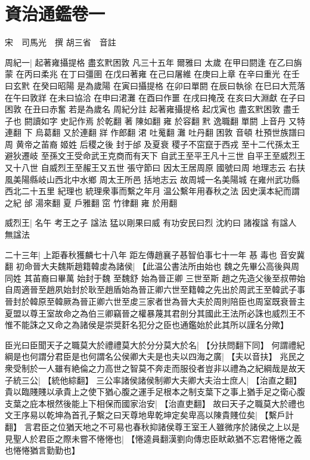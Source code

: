 \chapter{資治通鑑卷一}


宋　司馬光　撰\newline
胡三省　音註

周紀一|{
	起著雍攝提格 盡玄黓困敦 凡三十五年
	爾雅曰
	太歲
	在甲曰閼逢
	在乙曰旃蒙
	在丙曰柔兆
	在丁曰彊圉
	在戊曰著雍
	在己曰屠維
	在庚曰上章
	在辛曰重光
	在壬曰玄黓
	在癸曰昭陽
	是為歲陽
	在寅曰攝提格
	在卯曰單閼
	在辰曰執徐
	在巳曰大荒落
	在午曰敦牂
	在未曰協洽
	在申曰涒灘
	在酉曰作噩
	在戌曰掩茂
	在亥曰大淵獻
	在子曰困敦
	在丑曰赤奮
	若是為歲名
	周紀分註 起著雍攝提格 起戊寅也
	盡玄黓困敦 盡壬子也
	閼讀如字 史記作焉 於乾翻
	著 陳如翻
	雍 於容翻
	黓 逸職翻
	單閼 上音丹 又特連翻
	下 烏葛翻 又於連翻
	牂 作郎翻
	涒 吐䰟翻
	灘 吐丹翻
	困敦 音頓
	杜預世族譜曰 周 黄帝之苖裔 姬姓
	后稷之後 封于邰 及夏衰 稷子不窋竄于西戎
	至十二代孫太王 避狄遷岐
	至孫文王受命武王克商而有天下
	自武王至平王凡十三世
	自平王至威烈王又十八世
	自威烈王至赧王又五世
	張守節曰 因太王居周原 國號曰周
	地理志云 右扶風美陽縣岐山西北中水鄉 周太王所邑
	括地志云 故周城一名美陽城 在雍州武功縣西北二十五里 紀理也 統理衆事而繫之年月
	温公繫年用春秋之法 因史漢本紀而謂之紀
	邰 湯來翻
	夏 戶雅翻
	窋 竹律翻
	雍 於用翻}
\par
威烈王|{
	名午 考王之子
	諡法 猛以剛果曰威 有功安民曰烈
	沈約曰 諸複諡 有諡人 無諡法}
\par
二十三年|{
	上距春秋獲麟七十八年 距左傳趙襄子惎智伯事七十一年
	惎 毒也 音安冀翻}
初命晉大夫魏斯趙籍韓䖍為諸侯|{
	【此温公書法所由始也
	魏之先畢公高後與周同姓 其苖裔曰畢萬 始封于魏
	至魏舒 始為晉正卿 三世至斯
	趙之先造父後至叔帶始自周適晉至趙夙始封於耿至趙盾始為晉正卿六世至籍韓之先出於周武王至韓武子事晉封於韓原至韓厥為晉正卿六世至䖍三家者世為晉大夫於周則陪臣也周室既衰晉主夏盟以尊王室故命之為伯三卿竊晉之權暴蔑其君剖分其國此王法所必誅也威烈王不惟不能誅之又命之為諸侯是崇奨姧名犯分之臣也通鑑始於此其所以謹名分歟】}
\par
臣光曰臣聞天子之職莫大於禮禮莫大於分分莫大於名|{
	【分扶問翻下同】}
何謂禮紀綱是也何謂分君臣是也何謂名公侯卿大夫是也夫以四海之廣|{
	【夫以音扶】}
兆民之衆受制於一人雖有絶倫之力高世之智莫不奔走而服役者豈非以禮為之紀綱哉是故天子統三公|{
	【統他綜翻】}
三公率諸侯諸侯制卿大夫卿大夫治士庶人|{
	【治直之翻】}
貴以臨賤賤以承貴上之使下猶心腹之運手足根本之制支葉下之事上猶手足之衛心腹支葉之庇本根然後能上下相保而國家治安|{
	【治直吏翻】}
故曰天子之職莫大於禮也文王序易以乾坤為首孔子繫之曰天尊地卑乾坤定矣卑高以陳貴賤位矣|{
	【繫戶計翻】}
言君臣之位猶天地之不可易也春秋抑諸侯尊王室王人雖微序於諸侯之上以是見聖人於君臣之際未嘗不惓惓也|{
	【惓逵員翻漢劉向傳忠臣畎畝猶不忘君惓惓之義也惓惓猶言勤勤也】}
